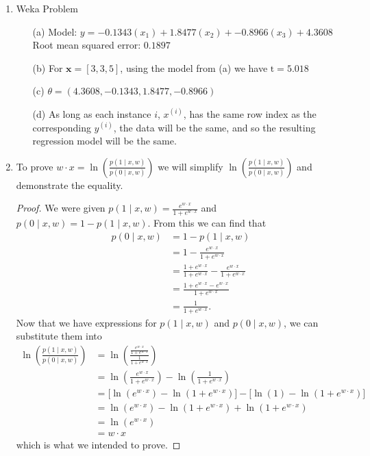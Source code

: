 \documentclass[12pt]{article}
\begin{document}
\begin{enumerate}
  \item Weka Problem
  	\begin{enumerate}
  	\item[(a)] Model: $y= -0.1343(x_1) + 1.8477(x_2) + -0.8966(x_3) + 4.3608$ \\
  	Root mean squared error: $0.1897$
  	\item[(b)] For $\textbf{x} = [3,3,5]$, using the model from (a) we have $\text{\^{t}} = 5.018$
  	\item[(c)] $\theta = (4.3608, -0.1343, 1.8477, -0.8966)$ 
  	\item[(d)] As long as each instance $i$, $x^{(i)}$, has the same row index as the corresponding $y^{(i)}$, the data will be the same, and so the resulting regression model will be the same. 
  	\end{enumerate}
  \item To prove $ w \cdot x = \ln\left( \frac{p(1\mid x,w)}{p(0\mid x,w)}\right)  $ we will simplify $\ln\left( \frac{p(1\mid x,w)}{p(0\mid x,w)}\right) $ and demonstrate the equality.
  
   \begin{proof}We were given $p(1\mid x,w) =\frac{e^{w \cdot x}}{1 + e^{w \cdot x}}$ and $p(0\mid x,w) = 1 - p(1\mid x,w)$. From this we can find that 
	\begin{align*}
	p(0\mid x,w) &= 1 - p(1\mid x,w) \\
	&= 1 - \frac{e^{w \cdot x}}{1 + e^{w \cdot x}} \\
	&= \frac{1 + e^{w \cdot x}}{1 + e^{w \cdot x}} - \frac{e^{w \cdot x}}{1 + e^{w \cdot x}} \\
	&= \frac{1 + e^{w \cdot x} - e^{w \cdot x}}{1 + e^{w \cdot x}} \\
	&= \frac{1}{1 + e^{w \cdot x}} .
	\end{align*}
   Now that we have expressions for $p(1\mid x,w)$ and $p(0\mid x,w)$, we can substitute them into
   	\begin{align*}
   	\ln\left(\frac{p(1\mid x,w)}{p(0\mid x,w)}\right) &= \ln \left( \frac{\frac{e^{w \cdot x}}{1 + e^{w \cdot x}}}{\frac{1}{1 + e^{w \cdot x}}} \right)  \\
   	&= \ln \left( \frac{e^{w \cdot x}}{1 + e^{w \cdot x}} \right) - \ln \left( \frac{1}{1 + e^{w \cdot x}} \right) \\
   	&= \Big[ \ln \left( e^{w \cdot x} \right) - \ln \left( 1 + e^{w \cdot x} \right)  \Big] - \Big[ \ln \left( 1 \right) - \ln \left( 1 + e^{w \cdot x} \right)   \Big] \\
   	&= \ln \left( e^{w \cdot x} \right) - \ln \left( 1 + e^{w \cdot x} \right) + \ln \left( 1 + e^{w \cdot x} \right) \\
   	&= \ln \left( e^{w \cdot x} \right) \\
   	&= w \cdot x
   	\end{align*}
   which is what we intended to prove.
   \end{proof}
   

\end{enumerate}
\end{document}
